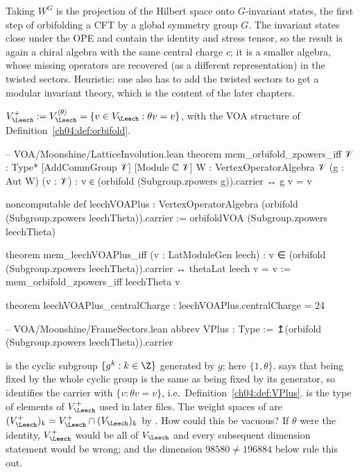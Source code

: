 \begin{physics}
Taking $W^G$ is the projection of the Hilbert space onto $G$-invariant states, the first step of orbifolding a CFT by a global symmetry group $G$. The invariant states close under the OPE and contain the identity and stress tensor, so the result is again a chiral algebra with the same central charge $c$; it is a smaller algebra, whose missing operators are recovered (as a different representation) in the twisted sectors. Heuristic: one also has to add the twisted sectors to get a modular invariant theory, which is the content of the later chapters.
\end{physics}

\begin{definition}[$V_\Leech^+$]\label{ch04:def:VPlus}
$V_\Leech^+:=V_\Leech^{\langle\theta\rangle}=\{v\in V_\Leech:\theta v=v\}$, with the VOA structure of
Definition~\ref{ch04:def:orbifold}.
\end{definition}

\begin{leancode}
-- VOA/Moonshine/LatticeInvolution.lean
theorem mem_orbifold_zpowers_iff {𝒱 : Type*} [AddCommGroup 𝒱] [Module ℂ 𝒱]
    {W : VertexOperatorAlgebra 𝒱} (g : Aut W) (v : 𝒱) :
    v ∈ (orbifold (Subgroup.zpowers g)).carrier ↔ g v = v

noncomputable def leechVOAPlus :
    VertexOperatorAlgebra (orbifold (Subgroup.zpowers leechTheta)).carrier :=
  orbifoldVOA (Subgroup.zpowers leechTheta)

theorem mem_leechVOAPlus_iff (v : LatModuleGen leech) :
    v ∈ (orbifold (Subgroup.zpowers leechTheta)).carrier ↔ thetaLat leech v = v :=
  mem_orbifold_zpowers_iff leechTheta v

theorem leechVOAPlus_centralCharge : leechVOAPlus.centralCharge = 24

-- VOA/Moonshine/FrameSectors.lean
abbrev VPlus : Type := ↥(orbifold (Subgroup.zpowers leechTheta)).carrier
\end{leancode}

\begin{dictionary}
 is the cyclic subgroup $\{g^k:k\in\Z\}$ generated by $g$; here
$\{1,\theta\}$.  says that being fixed by the whole cyclic group is
the same as being fixed by its generator, so  identifies the carrier
with $\{v:\theta v=v\}$, i.e.\ Definition~\ref{ch04:def:VPlus}.  is the type of
elements of $V_\Leech^+$ used in later files. The weight spaces of  are
$(V_\Leech^+)_k=V_\Leech^+\cap(V_\Leech)_k$ by . How could this be vacuous? If $\theta$
were the identity, $V_\Leech^+$ would be all of $V_\Leech$ and every subsequent dimension statement
would be wrong;  and the dimension $98580\neq196884$ below rule this out.
\end{dictionary}

